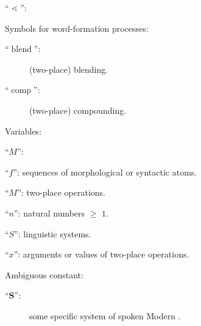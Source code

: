 \documentclass[output=paper
  ,nobabel
  ,draftmode
  ,colorlinks, citecolor=brown
]{langscibook}
\begin{document}
\begin{labeledlist}{``$⋖$'':}
\end{labeledlist} Symbols for word-formation processes: \begin{description}
\item[``$\operatorname{blend}$'':] (two-place) blending.
\item[``$\operatorname{comp}$'':] (two-place) compounding.
\end{description} Variables: \begin{labeledlist}{``$M$'':}
\item[``$f$'':] sequences of morphological or syntactic atoms.
\item[``$M$'':] two-place operations.
\item[``$n$'':] natural numbers $≥$ $1$.
\item[``$S$'':] linguistic systems.
\item[``$x$'':] arguments or values of two-place operations.
\end{labeledlist} Ambiguous constant: \begin{description}
\item[``$\mathbf{S}$'':] some specific system of spoken Modern .
\end{description}


{\sloppy
\printbibliography[heading=subbibliography,notkeyword=source]
\newrefcontext[labelprefix=S]
\printbibliography[heading=subbibliography,keyword=source,env=sources,title={List of sources}]
}
\end{document}
